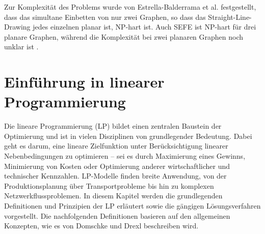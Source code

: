 \documentclass[bachelor, german]{algothesis}
\begin{document}
Zur Komplexität des Problems wurde von Estrella-Balderrama et al.\cite{Estrella} festgestellt, dass das simultane Einbetten von nur zwei Graphen, so dass das Straight-Line-Drawing jedes einzelnen planar ist, NP-hart ist. Auch SEFE ist NP-hart für drei planare Graphen, während die Komplexität bei zwei planaren Graphen noch unklar ist \cite{Gassner}. 

\section{Einführung in linearer Programmierung}
Die lineare Programmierung (LP) bildet einen zentralen Baustein der Optimierung und ist in vielen Disziplinen von grundlegender Bedeutung. Dabei geht es darum, eine lineare Zielfunktion unter Berücksichtigung linearer Nebenbedingungen zu optimieren – sei es durch Maximierung eines Gewinns, Minimierung von Kosten oder Optimierung anderer wirtschaftlicher und technischer Kennzahlen.\newline
LP-Modelle finden breite Anwendung, von der Produktionsplanung über Transportprobleme bis hin zu komplexen Netzwerkflussproblemen. In diesem Kapitel werden die grundlegenden Definitionen und Prinzipien der LP erläutert sowie die gängigen Lösungsverfahren vorgestellt.
Die nachfolgenden Definitionen basieren auf den allgemeinen Konzepten, wie es von Domschke und Drexl \cite{Operation} beschreiben wird.
\end{document}

